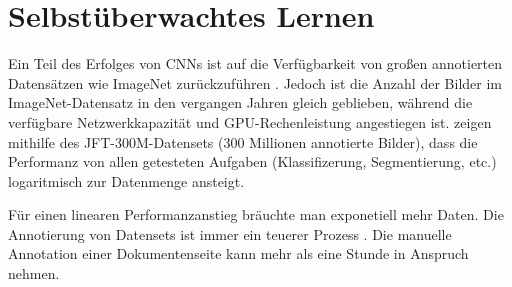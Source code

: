 \chapter{Selbstüberwachtes Lernen}
\label{chap:selfsupervised}
Ein Teil des Erfolges von CNNs ist auf die Verfügbarkeit von großen annotierten Datensätzen wie ImageNet zurückzuführen
\autocite{SunRevisitingUnreasonableEffectiveness2017}.
Jedoch ist die Anzahl der Bilder im ImageNet-Datensatz in den vergangen Jahren gleich geblieben, während die  verfügbare Netzwerkkapazität und GPU-Rechenleistung angestiegen ist.
\citeauthor{SunRevisitingUnreasonableEffectiveness2017} zeigen mithilfe des JFT-300M-Datensets (300 Millionen annotierte Bilder), dass die Performanz von allen getesteten Aufgaben (Klassifizerung, Segmentierung, etc.)
logaritmisch zur Datenmenge ansteigt. 

Für einen linearen Performanzanstieg bräuchte man exponetiell mehr Daten.
Die Annotierung von Datensets ist immer ein teuerer Prozess \autocite[988]{ValvenyDatasetsAnnotationsDocument2014}.
Die manuelle Annotation einer Dokumentenseite kann mehr als eine Stunde in Anspruch nehmen. 





